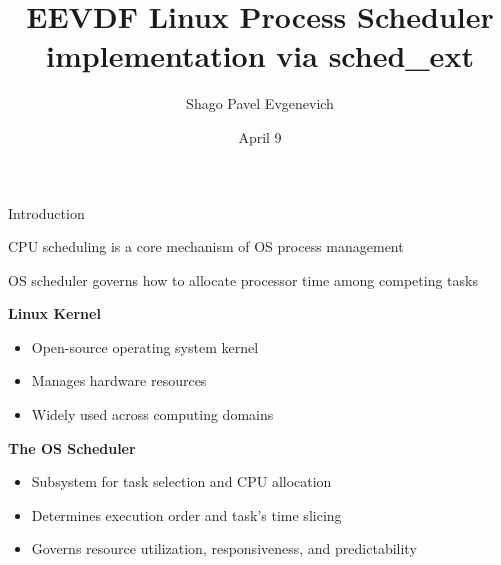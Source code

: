 \documentclass[aspectratio=169]{beamer}
\title{EEVDF Linux Process Scheduler implementation via sched\_ext}
\author{Shago Pavel Evgenevich}
\institute {
        Saint Petersburg State University\\
        \vspace{0.2cm}
        CPS 2026
}
\date{\small April 9}
\begin{document}
\begin{frame}
        \titlepage
\end{frame}

\begin{frame}{Introduction}
        \begin{shadowbox2}
                \small CPU scheduling is a core mechanism of OS
                process management

                \small OS scheduler governs how to allocate
                processor time among competing tasks
        \end{shadowbox2}
        \vspace{0.7em}

        \textbf{Linux Kernel}
        \begin{itemize}
                \item Open-source operating system kernel
                \item Manages hardware resources
                \item Widely used across computing domains
        \end{itemize}

        \vspace{0.5em}

        \textbf{The OS Scheduler}
        \begin{itemize}
                \item Subsystem for task selection and CPU allocation
                \item Determines execution order and task's time slicing
                \item Governs resource utilization, responsiveness,
                        and predictability
        \end{itemize}
\end{frame}
\end{document}
